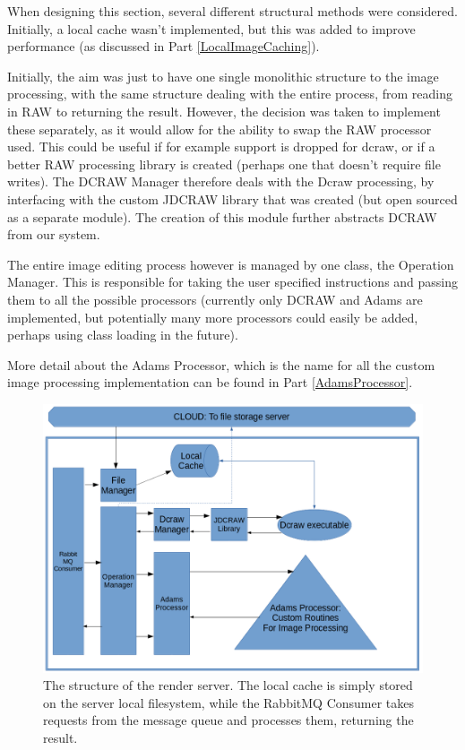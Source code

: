 \documentclass[11pt,a4paper]{article}
\begin{document}
When designing this section, several different structural methods were considered. Initially, a local
cache wasn't implemented, but this was added to improve performance (as discussed in Part \ref{LocalImageCaching}).

Initially, the aim was just to have one single monolithic structure to the image processing, with the same structure
dealing with the entire process, from reading in RAW to returning the result. However, the decision was taken to
implement these separately, as it would allow for the ability to swap the RAW processor used. This could be useful
if for example support is dropped for dcraw, or if a better RAW processing library is created (perhaps one that doesn't 
require file writes). The DCRAW Manager therefore deals with the Dcraw processing, by interfacing with the custom JDCRAW
library that was created (but open sourced as a separate module). The creation of this module further abstracts DCRAW from
our system.

The entire image editing process however is managed by one class, the Operation Manager. This is responsible for taking the user
specified instructions and passing them to all the possible processors (currently only DCRAW and Adams are implemented, but potentially
many more processors could easily be added, perhaps using class loading in the future).

More detail about the Adams Processor, which is the name for all the custom image processing implementation can be found in Part \ref{AdamsProcessor}.
\begin{figure}\label{renderserverdiagram}
    \includegraphics[width=\linewidth]{renderserverdiagram}
    \caption{The structure of the render server. The local cache is simply stored on the server local filesystem,
    while the RabbitMQ Consumer takes requests from the message queue and processes them, returning the result.}
\end{figure}
\end{document}
